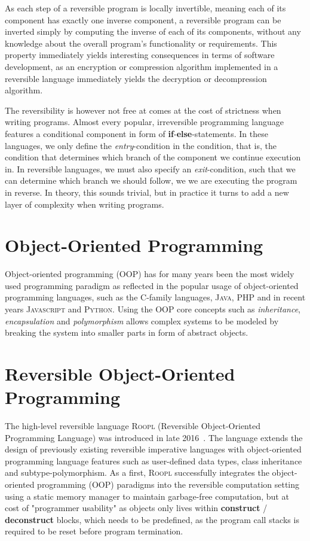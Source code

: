 As each step of a reversible program is locally invertible, meaning each of its component has exactly one inverse component, a reversible program can be inverted simply by computing the inverse of each of its components, without any knowledge about the overall program's functionality or requirements. This property immediately yields interesting consequences in terms of software development, as an encryption or compression algorithm implemented in a reversible language immediately yields the decryption or decompression algorithm.

The reversibility is however not free at comes at the cost of strictness when writing programs. Almost every popular, irreversible programming language features a conditional component in form of \textbf{if}-\textbf{else}-statements. In these languages, we only define the \textit{entry}-condition in the condition, that is, the condition that determines which branch of the component we continue execution in. In reversible languages, we must also specify an \textit{exit}-condition, such that we can determine which branch we should follow, we we are executing the program in reverse. In theory, this sounds trivial, but in practice it turns to add a new layer of complexity when writing programs.


\section{Object-Oriented Programming}
\label{sec:object-oriented-programming}
Object-oriented programming (OOP) has for many years been the most widely used programming paradigm as reflected in the popular usage of object-oriented programming languages, such as the \textsc{C}-family languages, \textsc{Java}, \textsc{PHP} and in recent years \textsc{Javascript} and \textsc{Python}. Using the OOP core concepts such as \textit{inheritance}, \textit{encapsulation} and \textit{polymorphism} allows complex systems to be modeled by breaking the system into smaller parts in form of abstract objects. 


\section{Reversible Object-Oriented Programming}
\label{sec:reversible-object-oriented-programming}
The high-level reversible language \textsc{Roopl} (Reversible Object-Oriented Programming Language) was introduced in late 2016~\cite{th:roopl, th:roopl2}. The language extends the design of previously existing reversible imperative languages with object-oriented programming language features such as user-defined data types, class inheritance and subtype-polymorphism. As a first, \textsc{Roopl} successfully integrates the object-oriented programming (OOP) paradigms into the reversible computation setting using a static memory manager to maintain garbage-free computation, but at cost of "programmer usability" as objects only lives within \textbf{construct} / \textbf{deconstruct} blocks, which needs to be predefined, as the program call stacks is required to be reset before program termination.
 

